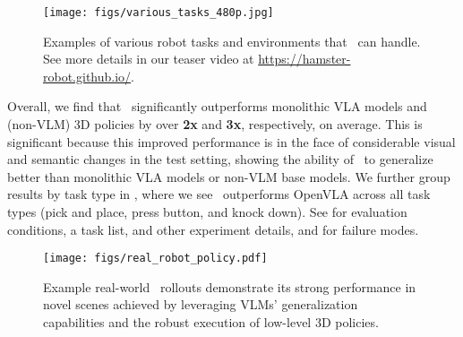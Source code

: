 \begin{figure}[t!]
    \centering
    \texttt{[image: figs/various\_tasks\_480p.jpg]}
    \caption{\footnotesize Examples of various robot tasks and environments that \method\ can handle. See more details in our teaser video at \href{https://hamster-robot.github.io/}{https://hamster-robot.github.io/}.}
    \label{fig:various_tasks}
\end{figure}

Overall, we find that \method\ significantly outperforms monolithic VLA models and (non-VLM) 3D policies by over \textbf{2x} and \textbf{3x}, respectively, on average. This is significant because this improved performance is in the face of considerable visual and semantic changes in the test setting, showing the ability of \method~to generalize better %
than monolithic VLA models or non-VLM base models. 
We further group results by task type in , where we see \method\ outperforms OpenVLA across all task types (pick and place, press button, and knock down). See  for evaluation conditions, a task list, and other experiment details, and  for failure modes.

\begin{figure}[!t]
    \centering
    \texttt{[image: figs/real\_robot\_policy.pdf]}
    \caption{\footnotesize{Example real-world \method\ rollouts demonstrate its strong performance in novel scenes achieved by leveraging VLMs' generalization capabilities and the robust execution of low-level 3D policies.}}
    \label{fig:experiments:real_robot_policy}
    \vspace{-2mm}
\end{figure}

\vspace{-2mm}
